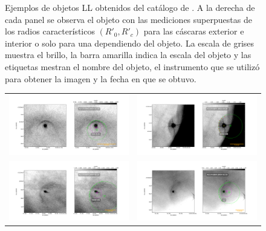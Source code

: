 \begin{figure}
\begin{tabular}{cc}
  \end{tabular}
  \caption{Ejemplos de objetos LL obtenidos del catálogo de \citet{Gutierrez-Soto:2015a}. A la derecha de cada panel se observa el objeto con las mediciones superpuestas de los radios característicos $(R'_0, R'_c)$ para las cáscaras exterior e interior o solo para una dependiendo del objeto. La escala de grises muestra el brillo, la barra amarilla indica la escala del objeto y las etiquetas mestran el nombre del objeto, el instrumento que se utilizó para obtener la imagen y la fecha en que se obtuvo.}
  \label{fig:Luis-mosaic-1}
\end{figure}


\begin{figure}
  \ContinuedFloat
    \captionsetup{list=off,format=cont}
  \begin{tabular}{cc}
    \includegraphics[width=0.5\linewidth]{./Figures/116-3101-Bally_14-images} & \includegraphics[width=0.5\linewidth]{./Figures/4285-458-Robberto_ACS_1r_f658n-images} \\ \includegraphics[width=0.5\linewidth]{./Figures/4468-605-Bally_17-images} &
\includegraphics[width=0.5\linewidth]{./Figures/LL3-Bally_17-images}
  \end{tabular}
  \caption{}
  \label{fig:Luis-mosaic-2}
\end{figure}



